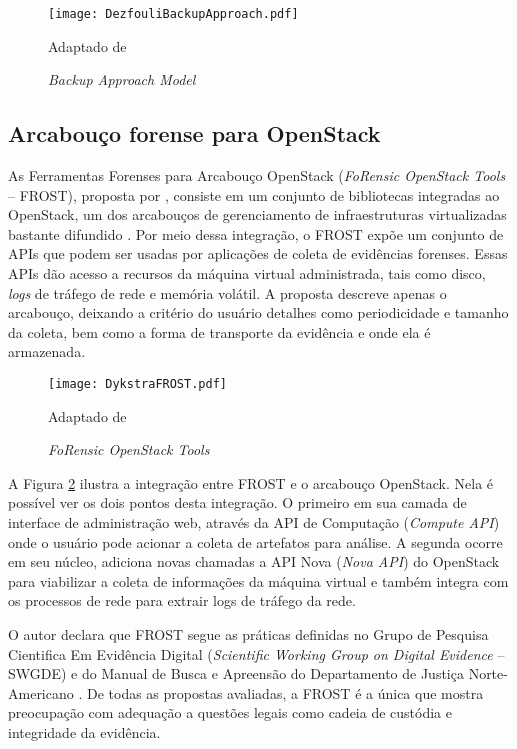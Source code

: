 \begin{figure}[htb!]
\footnotesize
\caption{\textit{Backup Approach Model}}
\texttt{[image: DezfouliBackupApproach.pdf]}
\centering
\label{fig:DezfouliBackupApproach}
\begin{center}
Adaptado de \cite{DezfouliBackupApproach:2012} 
\end{center}
\end{figure}


\subsection{Arcabouço forense para OpenStack}
\label{sec:frost}

As Ferramentas Forenses para Arcabouço OpenStack (\textit{FoRensic OpenStack Tools} -- FROST), proposta por \cite{DykstraFROST:2013}, consiste em um conjunto de bibliotecas integradas ao OpenStack, um dos arcabouços de gerenciamento de infraestruturas virtualizadas bastante difundido \cite{StackFramework:2018}.
%
Por meio dessa integração, o FROST expõe um conjunto de APIs que podem ser usadas por aplicações de coleta de evidências forenses.
%
Essas APIs dão acesso a recursos da máquina virtual administrada, tais como disco, \textit{logs} de tráfego de rede e memória volátil.
%
A proposta descreve apenas o arcabouço, deixando a critério do usuário detalhes como periodicidade e tamanho da coleta, bem como a forma de transporte da evidência e onde ela é armazenada.

\begin{figure}[htb!]
\footnotesize
\caption{\textit{FoRensic OpenStack Tools}}
\texttt{[image: DykstraFROST.pdf]}
\centering
\label{fig:DykstraFROST}
\begin{center}
Adaptado de \cite{DykstraFROST:2013} 
\end{center}
\end{figure}
%

A Figura \ref{fig:DykstraFROST} ilustra a integração entre FROST e o arcabouço OpenStack.
%
Nela é possível ver os dois pontos desta integração. O primeiro em sua camada de interface de administração web, através da API de Computação (\textit{Compute API}) onde o usuário pode acionar a coleta de artefatos para análise.
%
A segunda ocorre em seu núcleo, adiciona novas chamadas a API Nova (\textit{Nova API}) do OpenStack para viabilizar a coleta de informações da máquina virtual e também integra com os processos de rede para extrair logs de tráfego da rede.


O autor declara que FROST segue as práticas definidas no Grupo de Pesquisa Cientifica Em Evidência Digital (\textit{Scientific Working Group on Digital Evidence} -- SWGDE) e do Manual de Busca e Apreensão do Departamento de Justiça Norte-Americano \cite{DykstraFROST:2013}.
%
De todas as propostas avaliadas, a FROST é a única que mostra preocupação com adequação a questões legais como cadeia de custódia e integridade da evidência.
%

